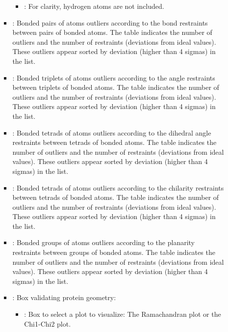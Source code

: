 \begin{itemize}
\begin{itemize}
\begin{itemize}
\begin{itemize}
           \item {}: For clarity, hydrogen atoms are not included.
          \end{itemize}
          
         \item {}: Bonded pairs of atoms outliers according to the bond restraints between pairs of bonded atoms. The  table indicates the number of outliers and the number of restraints (deviations from ideal values). These outliers appear sorted by deviation (higher than 4 sigmas) in the  list.
         \item {}: Bonded triplets of atoms outliers according to the angle restraints between triplets of bonded atoms. The  table indicates the number of outliers and the number of restraints (deviations from ideal values). These outliers appear sorted by deviation (higher than 4 sigmas) in the  list.
         \item {}: Bonded tetrads of atoms outliers according to the dihedral angle restraints between tetrads of bonded atoms. The  table indicates the number of outliers and the number of restraints (deviations from ideal values). These outliers appear sorted by deviation (higher than 4 sigmas) in the  list.
         \item {}: Bonded tetrads of atoms outliers according to the chilarity restraints between tetrads of bonded atoms. The  table indicates the number of outliers and the number of restraints (deviations from ideal values). These outliers appear sorted by deviation (higher than 4 sigmas) in the  list.
         \item {}: Bonded groups of atoms outliers according to the planarity restraints between groups of bonded atoms. The  table indicates the number of outliers and the number of restraints (deviations from ideal values). These outliers appear sorted by deviation (higher than 4 sigmas) in the  list.
         \item {}: Box validating protein geometry:
         \begin{itemize}
          \item {}: Box to select a plot to visualize: The Ramachandran plot or the Chi1-Chi2 plot.

\end{itemize}
\end{itemize}
\end{itemize}
\end{itemize}
